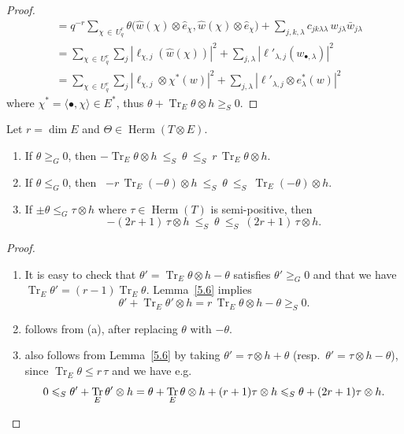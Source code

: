 \documentclass[AHL,Unicode,longabstracts,published]{cedram}
\DeclareMathOperator{\Herm}{Herm}
\DeclareMathOperator{\Tr}{Tr}
\let\leq\leqslant
\let\geq\geqslant
\begin{document}
\begin{proof}
\begin{align*}
&= q^{-r} \sum_{\chi\,\in\,U^r_q}\theta\big(\widehat w(\chi)\otimes\widehat e_\chi,
\widehat w(\chi)\otimes\widehat e_\chi\big)+\sum_{j,k,\lambda} c_{jk\lambda\lambda}\, w_{j\lambda}\bar w_{j\lambda}
\\
&=
\sum_{\chi\,\in\,U^r_q}\sum_j\left|\ell_{\chi,j}(\widehat w(\chi))\right|^2+\sum_{j,\lambda}
\left|\ell'_{\lambda,j}(w_{{\scriptscriptstyle\bullet},\lambda})\right|^2
\\
&=
\sum_{\chi\,\in\,U^r_q}\sum_j\left|\ell_{\chi,j}\otimes\chi^*(w)\right|^2+
\sum_{j,\lambda}\left|\ell'_{\lambda,j}\otimes e_\lambda^*(w)\right|^2
\end{align*}
where $\chi^*=\langle\bullet,\chi\rangle\in E^*$, thus $\theta + \Tr_E \theta \otimes h\geq_S 0$.
\end{proof}

\begin{coro}
Let $r=\dim E$ and $\Theta\in\Herm(T\otimes E)$.
\begin{enumerate}
\item If $\theta\geq_G 0$, then\kern27pt
$-\Tr_E\theta\otimes h~\leq_S~\theta~\leq_S~r\,\Tr_E\theta\otimes h$.
\item If $\theta\leq_G 0$, then~
$-r\,\Tr_E(-\theta)\otimes h~\leq_S~\theta~\leq_S~\Tr_E(-\theta)\otimes h$.
\item If $\pm\theta\leq_G\tau\otimes h$ where $\tau\in\Herm(T)$ is semi-positive, then
\[
-(2r+1)\,\tau\otimes h~\leq_S~\theta~\leq_S~(2r+1)\,\tau\otimes h.
\]
\end{enumerate}
\end{coro}
\begin{proof}
\begin{enumerate}
\item It is easy to check that $\theta'=\Tr_E\theta\otimes h-\theta$ satisfies $\theta'\geq_G 0$ and that we have $\Tr_E\theta'=(r-1)\Tr_E\theta$. Lemma~\ref{5.6} implies
\[
\theta'+\Tr_E\theta'\otimes h=r\,\Tr_E\theta\otimes h-\theta\geq_S 0.
\]
\item follows from (a), after replacing $\theta$ with $-\theta$.
\item also follows from Lemma~\ref{5.6} by taking $\theta'=\tau\otimes h+\theta$ (resp.\ $\theta'=\tau\otimes h-\theta$), since $\Tr_E\theta\leq r\,\tau$ and we have e.g.
\[
0\leq_S\theta'+\Tr_E\theta'\otimes h=
\theta+\Tr_E\theta\otimes h+(r+1)\tau\otimes h
\leq_S\theta+(2r+1)\tau\otimes h.
\qedhere
\]
\end{enumerate}
\end{proof}
\end{document}
